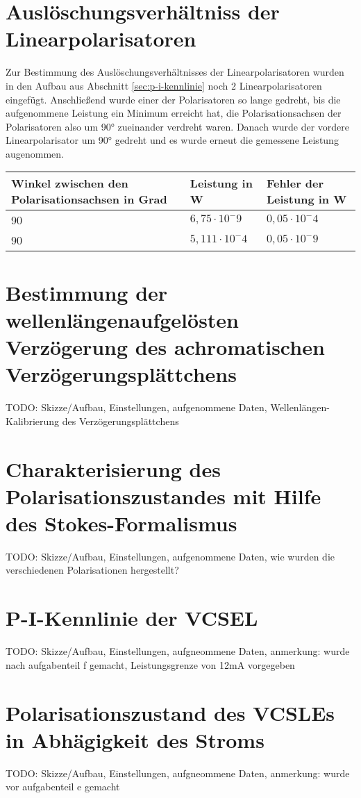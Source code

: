 \documentclass[bigchapter,colorback,accentcolor=tud4b,linedtoc,11pt]{tudreport}
\begin{document}
\section{Auslöschungsverhältniss der Linearpolarisatoren}
Zur Bestimmung des Auslöschungsverhältnisses der Linearpolarisatoren wurden in den Aufbau aus Abschnitt \ref{sec:p-i-kennlinie} noch 2 Linearpolarisatoren eingefügt.
Anschließend wurde einer der Polarisatoren so lange gedreht, bis die aufgenommene Leistung ein Minimum erreicht hat, die Polarisationsachsen der Polarisatoren also um 90° zueinander verdreht waren. Danach wurde der vordere Linearpolarisator um 90° gedreht und es wurde erneut die gemessene Leistung augenommen.

\begin{center}
  \begin{tabular}{|p{5cm}|p{4cm}|p{4.5cm}|}
    \hline
        Winkel zwischen den Polarisationsachsen in Grad & Leistung in W & Fehler der Leistung in W \\ \hline
        90 & $6,75 \cdot 10^-9$ & $0,05 \cdot 10^-4$ \\ \hline
        90 & $5,111 \cdot 10^-4$ & $0,05 \cdot 10^-9$ \\ \hline
	\end{tabular}
\end{center}
\section{Bestimmung der wellenlängenaufgelösten Verzögerung des achromatischen Verzögerungsplättchens}
TODO: Skizze/Aufbau, Einstellungen, aufgenommene Daten, Wellenlängen-Kalibrierung des Verzögerungsplättchens 

\section{Charakterisierung des Polarisationszustandes mit Hilfe des Stokes-Formalismus}
TODO: Skizze/Aufbau, Einstellungen, aufgenommene Daten, wie wurden die verschiedenen Polarisationen hergestellt?

\section{P-I-Kennlinie der VCSEL}
TODO: Skizze/Aufbau, Einstellungen, aufgneommene Daten, anmerkung: wurde nach aufgabenteil f gemacht, Leistungsgrenze von 12mA vorgegeben

\section{Polarisationszustand des VCSLEs in Abhägigkeit des Stroms}
TODO: Skizze/Aufbau, Einstellungen, aufgneommene Daten, anmerkung: wurde vor aufgabenteil e gemacht
\end{document}
